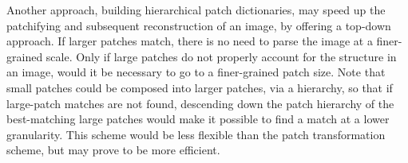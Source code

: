 Another approach, building hierarchical patch dictionaries, may speed up the patchifying and subsequent reconstruction of an image, by offering a top-down approach. If larger patches match, there is no need to parse the image at a finer-grained scale. Only if large patches do not properly account for the structure in an image, would it be necessary to go to a finer-grained patch size. Note that small patches could be composed into larger patches, via a hierarchy, so that if large-patch matches are not found, descending down the patch hierarchy of the best-matching large patches would make it possible to find a match at a lower granularity. This scheme would be less flexible than the patch transformation scheme, but may prove to be more efficient. 


